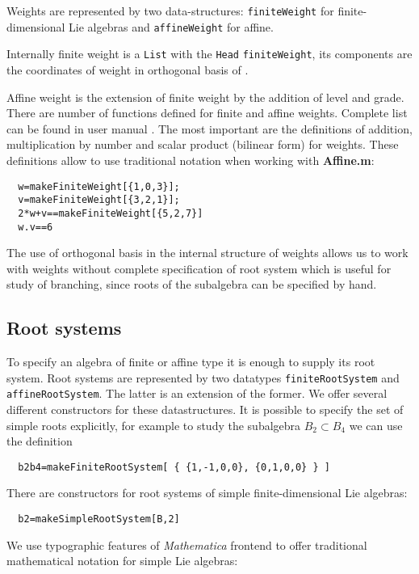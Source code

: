 \documentclass[preprint,12pt]{elsarticle}
\begin{document}
Weights are represented  by two data-structures: \lstinline{finiteWeight} for finite-dimensional Lie algebras and \lstinline{affineWeight}  for affine. 

Internally finite weight is a \lstinline{List} with the \lstinline{Head} \lstinline{finiteWeight}, its components are the coordinates of weight in orthogonal basis of \cite{bourbaki2002lie}. 

Affine weight is the extension of finite weight by the addition of level and grade. There are number of functions defined for finite and affine weights. Complete list can be found in user manual \cite{affinemanual}. The most important are the definitions of addition, multiplication by number and scalar product (bilinear form) for weights. These definitions allow to use traditional notation when working with {\bf Affine.m}:
\begin{lstlisting}
  w=makeFiniteWeight[{1,0,3}];
  v=makeFiniteWeight[{3,2,1}];
  2*w+v==makeFiniteWeight[{5,2,7}]
  w.v==6
\end{lstlisting}

The use of orthogonal basis in the internal structure of weights allows us to work with weights without complete specification of root system which is useful for study of branching, since roots of the subalgebra can be specified by hand.

\subsection{Root systems}
\label{sec:root-systems}

To specify an algebra of finite or affine type it is enough to supply its root system. Root systems are represented by two datatypes \lstinline{finiteRootSystem} and \lstinline{affineRootSystem}. The latter is an extension of the former. 
We offer several different constructors for these datastructures. 
It is possible to specify the set of simple roots explicitly, for example to study the subalgebra $B_2\subset B_4$ we can use the definition
\begin{lstlisting}
  b2b4=makeFiniteRootSystem[ { {1,-1,0,0}, {0,1,0,0} } ]
\end{lstlisting}
There are constructors for root systems of simple finite-dimensional Lie algebras:
\begin{lstlisting}
  b2=makeSimpleRootSystem[B,2]
\end{lstlisting}
We use typographic features of {\it Mathematica} frontend to offer traditional mathematical notation for simple Lie algebras:
\end{document}
